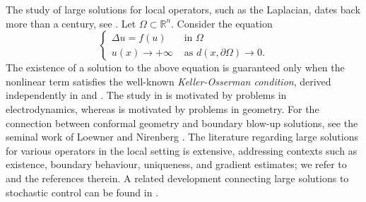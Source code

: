 \documentclass{amsart}
\newcommand{\rn}{\mathbb{R}^{n}}
\begin{document}
The study of large solutions for local operators, such as the Laplacian, dates back more than a century, see \cite{biberbach}. Let $\Omega\subset \rn$. Consider the equation 
\begin{equation*}
    \begin{cases}
        \Delta u=f(u) \quad &\text{in }\Omega\\
        u(x)\to +\infty  &\text{as }d(x,\partial\Omega)\to 0.
    \end{cases}
\end{equation*}
The existence of a solution to the above equation is guaranteed only when the nonlinear term satisfies the well-known \textit{Keller-Osserman condition}, derived independently in \cite{Keller1957} and \cite{Osserman1957}. The study in \cite{Keller1957} is motivated by problems in electrodynamics, whereas \cite{Osserman1957} is motivated by problems in geometry. For  the connection between conformal geometry and boundary blow-up solutions, see the seminal work of Loewner and Nirenberg \cite{LoewnerNirenberg1974}. The literature regarding large solutions for various operators in the local setting is extensive, addressing contexts such as existence, boundary behaviour, uniqueness, and gradient estimates; we refer to \cite{bandlemarcus4, bandlemarcus3, Lieberman, diaz1993,DumontDupaigneOlivierRuadulescu2007} and the references therein. A related development connecting large solutions to stochastic control can be found in \cite{lions}.
\end{document}
